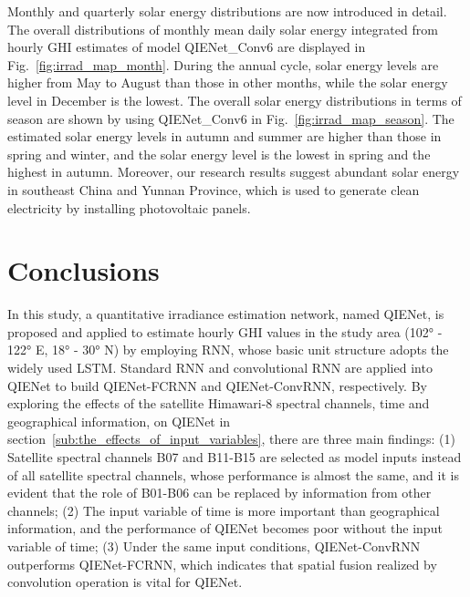 \documentclass[review]{elsarticle}
\begin{document}
Monthly and quarterly solar energy distributions are now introduced in detail.
The overall distributions of monthly mean daily solar energy integrated from hourly GHI estimates of model QIENet\_Conv6 are displayed in Fig.~\ref{fig:irrad_map_month}.
During the annual cycle, solar energy levels are higher from May to August than those in other months, while the solar energy level in December is the lowest.
The overall solar energy distributions in terms of season are shown by using QIENet\_Conv6 in Fig.~\ref{fig:irrad_map_season}.
The estimated solar energy levels in autumn and summer are higher than those in spring and winter, and the solar energy level is the lowest in spring and the highest in autumn.
Moreover, our research results suggest abundant solar energy in southeast China and Yunnan Province, which is used to generate clean electricity by installing photovoltaic panels.

\section{Conclusions}
\label{section:5}
In this study, a quantitative irradiance estimation network, named QIENet, is proposed and applied to estimate hourly GHI values in the study area (102° - 122° E, 18° - 30° N) by employing RNN, whose basic unit structure adopts the widely used LSTM.
Standard RNN and convolutional RNN are applied into QIENet to build QIENet-FCRNN and QIENet-ConvRNN, respectively.
By exploring the effects of the satellite Himawari-8 spectral channels, time and geographical information, on QIENet in section~\ref{sub:the_effects_of_input_variables}, there are three main findings:
(1) Satellite spectral channels B07 and B11-B15 are selected as model inputs instead of all satellite spectral channels, whose performance is almost the same, and it is evident that the role of B01-B06 can be replaced by information from other channels;
(2) The input variable of time is more important than geographical information, and the performance of QIENet becomes poor without the input variable of time;
(3) Under the same input conditions, QIENet-ConvRNN outperforms QIENet-FCRNN, which indicates that spatial fusion realized by convolution operation is vital for QIENet.
\end{document}

